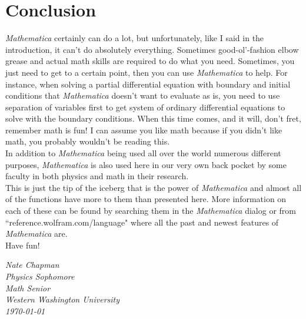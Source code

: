 \documentclass[11pt,letterpaper,twoside,titlepage]{report}
\newcommand{\Mathematica}{\textit{Mathematica} }
\begin{document}
%		
%		
%		
%		
				
	\chapter*{Conclusion}
	
		\Mathematica certainly can do a lot, but unfortunately, like I said in the introduction, it can't do absolutely everything.  Sometimes good-ol'-fashion elbow grease and actual math skills are required to do what you need.  Sometimes, you just need to get to a certain point, then you can use \Mathematica to help.  For instance, when solving a partial differential equation with boundary and initial conditions that \Mathematica doesn't want to evaluate as is, you need to use separation of variables first to get system of ordinary differential equations to solve with the boundary conditions. When this time comes, and it will, don't fret, remember math is fun!  I can assume you like math because if you didn't like math, you probably wouldn't be reading this. \\
	
		In addition to \Mathematica being used all over the world numerous different purposes, \Mathematica is also used here in our very own back pocket by some faculty in both physics and math in their research. \\
		
		This is just the tip of the iceberg that is the power of \Mathematica and almost all of the functions have more to them than presented here.  More information on each of these can be found by searching them in the \Mathematica dialog or from ``reference.wolfram.com/language" where all the past and newest features of \Mathematica are. \\
		
		Have fun! \\
		
		\begin{flushleft}
		
			\textit{Nate Chapman \\Physics Sophomore \\Math Senior \\ Western Washington University \\ \today} 
		
		\end{flushleft}
		
\end{document}
